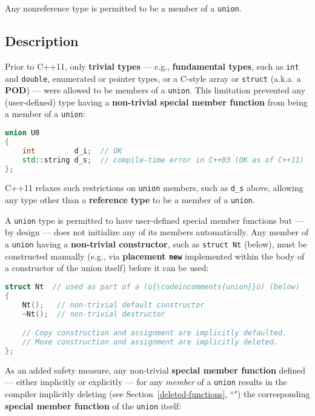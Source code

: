 

Any nonreference type is permitted to be a member of a \texttt{union}.

\subsection[Description]{Description}\label{unrestrictedunion-description}

Prior to C++11, only \textbf{trivial types} --- e.g.,
\textbf{fundamental types}, such as \texttt{int} and \texttt{double},
enumerated or pointer types, or a C-style array or \texttt{struct}
(a.k.a. a \textbf{POD}) --- were allowed to be members of a
\texttt{union}. This limitation prevented any (user-defined) type having
a \textbf{non-trivial special member function} from being a member of a
\texttt{union}:

\begin{lstlisting}[language=C++]
union U0
{
    int         d_i;  // OK
    std::string d_s;  // compile-time error in C++03 (OK as of C++11)
};
\end{lstlisting}
    
\noindent C++11 relaxes such restrictions on \texttt{union} members, such as
\texttt{d\_s} above, allowing any type other than a \textbf{reference
type} to be a member of a \texttt{union}.

A \texttt{union} type is permitted to have user-defined special member
functions but --- by design --- does not initialize any of its members
automatically. Any member of a \texttt{union} having a
\textbf{non-trivial constructor}, such as \texttt{struct}~\texttt{Nt}
(below), must be constructed manually (e.g., via \textbf{placement
\texttt{new}} implemented within the body of a constructor of the union
itself) before it can be used:

\begin{lstlisting}[language=C++]
struct Nt  // used as part of a (ù{\codeincomments{union}}ù) (below)
{
    Nt();   // non-trivial default constructor
    ~Nt();  // non-trivial destructor

    // Copy construction and assignment are implicitly defaulted.
    // Move construction and assignment are implicitly deleted.
};
\end{lstlisting}
    
\noindent As an added safety measure, any non-trivial \textbf{special member
function} defined --- either implicitly or explicitly --- for any
\emph{member} of a \texttt{union} results in the compiler implicitly
deleting (see Section~\ref{deleted-functions}, ``") the corresponding \textbf{special
member function} of the \texttt{union} itself:

